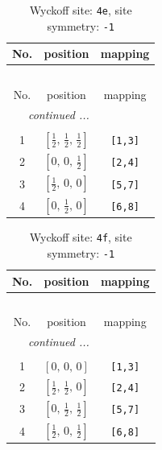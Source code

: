 \documentclass[fleqn,8pt]{jsarticle}
\begin{document}
\begin{longtable}{ccc}
\caption{Wyckoff site: {\tt 4e}, site symmetry: {\tt -1}}
 \\
 \hline \hline
No. & position & mapping \\ \hline \endfirsthead

\multicolumn{2}{l}{\tablename\ \thetable{}} \\
 \hline \hline
No. & position & mapping \\ \hline \endhead

 \hline \hline
\multicolumn{2}{r}{\footnotesize\it continued ...} \\ \endfoot

 \hline \hline
\multicolumn{2}{r}{} \\ \endlastfoot

1 & $\left[ \frac{1}{2},\, \frac{1}{2},\, \frac{1}{2} \right]$ & {\tt [1,3]} \\ \hline
2 & $\left[ 0,\, 0,\, \frac{1}{2} \right]$ & {\tt [2,4]} \\ \hline
3 & $\left[ \frac{1}{2},\, 0,\, 0 \right]$ & {\tt [5,7]} \\ \hline
4 & $\left[ 0,\, \frac{1}{2},\, 0 \right]$ & {\tt [6,8]} \\
\end{longtable}
\renewcommand{\arraystretch}{1.2}
\begin{longtable}{ccc}
\caption{Wyckoff site: {\tt 4f}, site symmetry: {\tt -1}}
 \\
 \hline \hline
No. & position & mapping \\ \hline \endfirsthead

\multicolumn{2}{l}{\tablename\ \thetable{}} \\
 \hline \hline
No. & position & mapping \\ \hline \endhead

 \hline \hline
\multicolumn{2}{r}{\footnotesize\it continued ...} \\ \endfoot

 \hline \hline
\multicolumn{2}{r}{} \\ \endlastfoot

1 & $\left[ 0,\, 0,\, 0 \right]$ & {\tt [1,3]} \\ \hline
2 & $\left[ \frac{1}{2},\, \frac{1}{2},\, 0 \right]$ & {\tt [2,4]} \\ \hline
3 & $\left[ 0,\, \frac{1}{2},\, \frac{1}{2} \right]$ & {\tt [5,7]} \\ \hline
4 & $\left[ \frac{1}{2},\, 0,\, \frac{1}{2} \right]$ & {\tt [6,8]} \\
\end{longtable}
\end{document}
